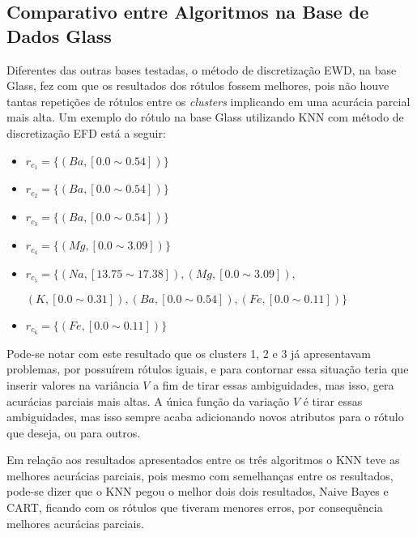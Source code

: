 \subsection{Comparativo entre Algoritmos na Base de Dados Glass} \label{cap:resultados:ssec:compalgoritmos:glass}

Diferentes das outras bases testadas, o método de discretização EWD, na base Glass, fez com que os resultados dos rótulos fossem melhores, pois não houve tantas repetições de rótulos entre os \textit{clusters} implicando em uma acurácia parcial mais alta. Um exemplo do rótulo na base Glass utilizando KNN com método de discretização EFD está a seguir:
\begin{itemize}[noitemsep]
 \item ${r_{c_1}=\{ (Ba,[ 0.0 \sim 0.54 ] )\} }$
 \item ${r_{c_2}=\{(Ba,[ 0.0 \sim 0.54 ] ) \} }$
 \item ${r_{c_3}=\{ (Ba,[ 0.0 \sim 0.54 ])  \} }$  
 \item ${r_{c_4}=\{ (Mg,[ 0.0 \sim 3.09 ] ) \}}$
 \item ${r_{c_5}=\{ (Na,[13.75 \sim  17.38 ] ), (Mg,[ 0.0 \sim 3.09 ] ), }$
 
 ${(K,[ 0.0 \sim 0.31 ] ), (Ba,[ 0.0 \sim 0.54 ] ), (Fe,[ 0.0 \sim 0.11] ) \} }$
 \item ${r_{c_6}=\{ (Fe,[ 0.0 \sim 0.11] ) \} }$
\end{itemize}

Pode-se notar com este resultado que os clusters 1, 2 e 3 já apresentavam problemas, por possuírem rótulos iguais, e para contornar essa situação teria que inserir valores na variância ${V}$ a fim de tirar essas ambiguidades, mas isso, gera acurácias parciais mais altas. A única função da variação ${V}$ é tirar essas ambiguidades, mas isso sempre acaba adicionando novos atributos para o rótulo que deseja, ou para outros.
 
Em relação aos resultados apresentados entre os três algoritmos o KNN teve as melhores acurácias parciais, pois mesmo com semelhanças entre os resultados, pode-se dizer que o KNN pegou o melhor dois dois resultados, Naive Bayes e CART, ficando com os rótulos que tiveram menores erros, por consequência melhores acurácias parciais. 



